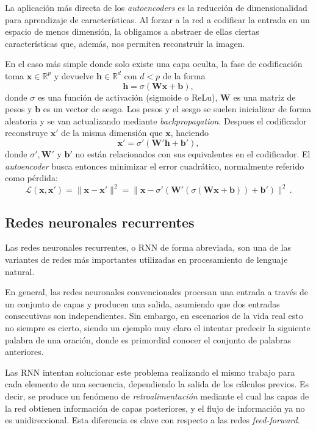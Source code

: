 \documentclass[
  a4paper,
  12pt,
  spanish,
]{scrartcl}
\theoremstyle{teorema-style}
\begin{document}
La aplicación más directa de los \textit{autoencoders} es la reducción de
dimensionalidad para aprendizaje de características. Al forzar a la red a
codificar la entrada en un espacio de menos dimensión, la obligamos a abstraer
de ellas ciertas características que, además, nos permiten reconstruir la
imagen.

En el caso más simple donde solo existe una capa oculta, la fase de codificación
toma $\pmb x \in \mathbb{R}^p$ y devuelve $\pmb h \in \mathbb{R}^d$ con $d < p$ de la
forma
\[
\pmb h = \sigma (\pmb W \pmb x+\pmb b),
\]
donde $\sigma$ es una función de activación (sigmoide o ReLu), $\pmb W$ es una matriz
de pesos y $\pmb b$ es un vector de sesgo. Los pesos y el sesgo se suelen inicializar
de forma aleatoria y se van actualizando mediante \textit{backpropagation}.
Despues el codificador reconstruye $\pmb x'$ de la misma dimensión que $\pmb x$, haciendo
\[
\pmb x' = \sigma' (\pmb W' \pmb h + \pmb b'),
\]
donde $\sigma', \pmb W'$ y $\pmb b'$ no están relacionados con sus equivalentes en el codificador. El \textit{autoencoder} busca entonces minimizar el error cuadrático, normalmente
referido como pérdida:
\[
\mathcal{L}(\pmb x, \pmb x') = \|\pmb x-\pmb x'\|^2 = \|\pmb x - \sigma'(\pmb W'(\sigma(\pmb W \pmb x + \pmb b))+ \pmb b')\|^2\,.
\]

\subsection{Redes neuronales recurrentes}%
\label{sub:redes_neuronales_recurrentes}

Las redes neuronales recurrentes, o RNN de forma abreviada, son una de las variantes de redes más importantes utilizadas en procesamiento de lenguaje natural.

En general, las redes neuronales convencionales procesan una entrada a través de un conjunto de capas y producen una salida, asumiendo que dos entradas consecutivas son independientes. Sin embargo, en escenarios de la vida real esto no siempre es cierto, siendo un ejemplo muy claro el intentar predecir la siguiente palabra de una oración, donde es primordial conocer el conjunto de palabras anteriores.

Las RNN intentan solucionar este problema realizando el mismo trabajo para cada elemento de una secuencia, dependiendo la salida de los cálculos previos. Es decir, se produce un fenómeno de \textit{retroalimentación} mediante el cual las capas de la red obtienen información de capas posteriores, y el flujo de información ya no es unidireccional. Esta diferencia es clave con respecto a las redes \textit{feed-forward}.
\end{document}
